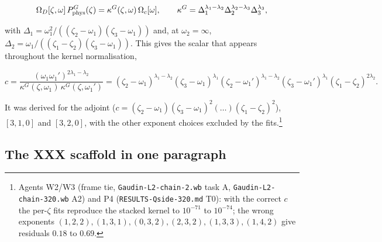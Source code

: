 \documentclass[11pt]{article}
\begin{document}
\begin{equation}
\Omega_D[\zeta,\omega]\,P^G_{\rm phys}(\zeta)=\kappa^G(\zeta,\omega)\,\Omega_c[\omega],\qquad \kappa^G=\Delta_1^{\lambda_1-\lambda_2}\Delta_2^{\lambda_2-\lambda_3}\Delta_3^{\lambda_3},\label{eq:kappaG}
\end{equation}

with $\Delta_1=\omega_1^2/((\zeta_2-\omega_1)(\zeta_3-\omega_1))$ and, at $\omega_2=\infty$, $\Delta_2=\omega_1/((\zeta_1-\zeta_2)(\zeta_3-\omega_1))$. This gives the scalar that appears throughout the kernel normalisation,

\begin{equation}
c=\frac{(\omega_1\omega_1')^{2\lambda_1-\lambda_2}}{\kappa^G(\zeta,\omega_1)\,\kappa^G(\zeta,\omega_1')}=(\zeta_2-\omega_1)^{\lambda_1-\lambda_2}(\zeta_3-\omega_1)^{\lambda_1}(\zeta_2-\omega_1')^{\lambda_1-\lambda_2}(\zeta_3-\omega_1')^{\lambda_1}(\zeta_1-\zeta_2)^{2\lambda_2}.\label{eq:cfactor}
\end{equation}

It was derived for the adjoint ($c=(\zeta_2-\omega_1)(\zeta_3-\omega_1)^2(\ldots)(\zeta_1-\zeta_2)^2$), $[3,1,0]$ and $[3,2,0]$, with the other exponent choices excluded by the fits.\footnote{Agents W2/W3 (frame tie, \texttt{Gaudin-\allowbreak{}L2-\allowbreak{}chain-\allowbreak{}2.\allowbreak{}wb} task A, \texttt{Gaudin-\allowbreak{}L2-\allowbreak{}chain-\allowbreak{}320.\allowbreak{}wb} A2) and P4 (\texttt{RESULTS-\allowbreak{}Qside-\allowbreak{}320.\allowbreak{}md} T0): with the correct $c$ the per-$\zeta$ fits reproduce the stacked kernel to $10^{-71}$ to $10^{-74}$; the wrong exponents $(1,2,2),(1,3,1),(0,3,2),(2,3,2),(1,3,3),(1,4,2)$ give residuals $0.18$ to $0.69$.}

\subsection{The XXX scaffold in one paragraph}\label{sec:scaffold}
\end{document}
